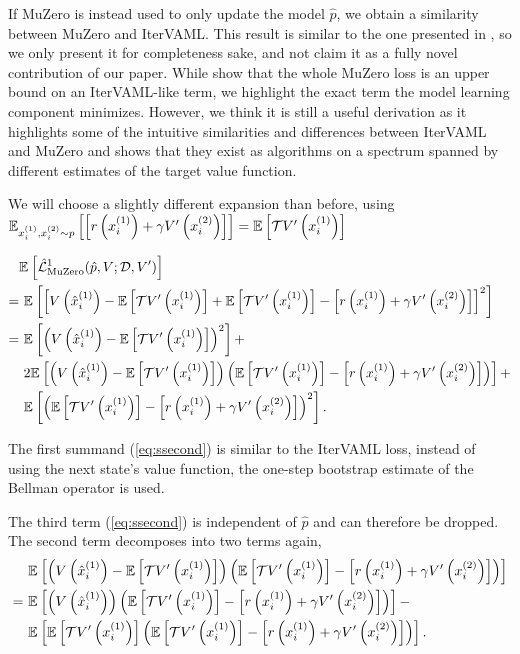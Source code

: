 \renewcommand{\TrVp}{\squareb{r\roundb{x^{(1)}_i} + \gamma V'\roundb{x^{(2)}_{i}} }}
\newcommand{\TrVpE}{\EEX{x_i^{(1)}, x_i^{(2)} \sim p}{\TrVp}}
\newcommand{\operatorVp}{\mathbb{E}\squareb{\mathcal{T}V'\roundb{\px{1}}}}

If MuZero is instead used to only update the model $\hat{p}$, we obtain a similarity between MuZero and IterVAML. 
This result is similar to the one presented in \cite{grimm2021proper}, so we only present it for completeness sake, and not claim it as a fully novel contribution of our paper.
While \cite{grimm2021proper} show that the whole MuZero loss is an upper bound on an IterVAML-like term, we highlight the exact term the model learning component minimizes.
However, we think it is still a useful derivation as it highlights some of the intuitive similarities and differences between IterVAML and MuZero and shows that they exist as algorithms on a spectrum spanned by different estimates of the target value function.

We will choose a slightly different expansion than before, using $\TrVpE = \operatorVp$

\begin{align}
    &\EEX{}{\hat{\mathcal{L}}^1_\text{MuZero}(\hat{p}, V; \mathcal{D}, V')}\nonumber\\ 
  = &~\EEX{}{\squareb{ V\roundb{\mx{1}} - \operatorVp + \operatorVp - \TrVp  }^2}\nonumber\\
  = &~\EEX{}{ \roundb{V\roundb{\mx{1}} - \operatorVp}^2}  +\label{eq:sfirst}\\
    &~2\EEX{}{\roundb{V\roundb{\mx{1}} - \operatorVp}\roundb{\operatorVp - \TrVp}} + \label{eq:ssecond}\\
    &~\EEX{}{\roundb{\operatorVp - \TrVp}^2}\label{eq:sthird}.
\end{align}


The first summand (\autoref{eq:ssecond}) is similar to the IterVAML loss, instead of using the next state's value function, the one-step bootstrap estimate of the Bellman operator is used.

The third term (\autoref{eq:ssecond}) is independent of $\hat{p}$ and can therefore be dropped. The second term decomposes into two terms again,
\begin{align*}
    &~\EEX{}{\roundb{V\roundb{\mx{1}} - \operatorVp}\roundb{\operatorVp - \TrVp}}\\
    =&~\EEX{}{\roundb{V\roundb{\mx{1}}}\roundb{\operatorVp - \TrVp}} - \\
    &~\EEX{}{\operatorVp\roundb{\operatorVp - \TrVp}}.
\end{align*}

